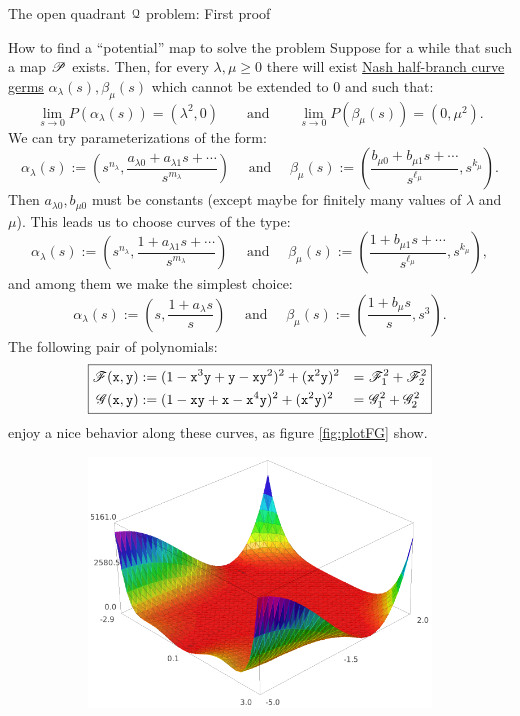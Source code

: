 \documentclass[11pt, a4paper, english, twoside, notitlepage, openright]{report}
\begin{document}
\begin{chapter}{The open quadrant $\Qu$ problem: First proof}
\begin{section}{How to find a ``potential'' map to solve the problem}
Suppose for a while that such a map $\P$ exists. Then, for every $\lambda,\mu\ge 0$ there will exist \hyperref[curveGerms]{Nash half-branch curve germs} $\alpha_{\lambda}(s),\beta_{\mu}(s)$ which cannot be extended to $0$ and such that:
$$
\lim_{s\rightarrow 0} P(\alpha_{\lambda}(s))=(\lambda^2,0)\qquad \text{and} \qquad \lim_{s\rightarrow 0} P(\beta_{\mu}(s))=(0,\mu^2).
$$
We can try parameterizations of the form:
$$
\alpha_{\lambda}(s):=\left(s^{n_{\lambda}},\frac{a_{\lambda 0}+a_{\lambda 1}s+\cdots}{s^{m_{\lambda}}}\right)
\quad \text{ and } \quad
\beta_{\mu}(s):=\left(\frac{b_{\mu 0}+b_{\mu 1}s+\cdots}{s^{\ell_{\mu}}},s^{k_{\mu}}\right).
$$
Then $a_{\lambda 0},b_{\mu 0}$ must be constants (except maybe for finitely many values of $\lambda$ and $\mu$). This leads us to choose curves of the type:
$$
\alpha_{\lambda}(s):=\left(s^{n_{\lambda}},\frac{1+a_{\lambda 1}s+\cdots}{s^{m_{\lambda}}}\right)
\quad \text{ and } \quad
\beta_{\mu}(s):=\left(\frac{1+b_{\mu 1}s+\cdots}{s^{\ell_{\mu}}},s^{k_{\mu}}\right),
$$
and among them we make the simplest choice: 
$$
\alpha_{\lambda}(s):=\left(s,\frac{1+a_{\lambda }s}{s}\right)
\quad \text{ and } \quad
\beta_{\mu}(s):=\left(\frac{1+b_{\mu }s}{s},s^{3}\right).
$$
The following pair of polynomials:
\begin{equation*}
\boxed{
\begin{aligned}
\F({\tt x},{\tt y})&:=(1-{\tt x}^3{\tt y}+{\tt y}-{\tt x}{\tt y}^2)^2+({\tt x}^2{\tt y})^2&=&\ \F_1^2+\F_2^2 \\
\G({\tt x},{\tt y})&:=(1-{\tt x}{\tt y}+{\tt x}-{\tt x}^4{\tt y})^2+({\tt x}^2{\tt y})^2&=&\ \G_1^2+\G_2^2\\
\end{aligned}
}
\end{equation*}
enjoy a nice behavior along these curves, as figure \ref{fig:plotFG} show.
\begin{figure}[h]\hspace{-0.15cm}
\begin{subfigure}{.49\linewidth}\centering
\includegraphics[width=1\textwidth]{plots/ch1_04_F.png}

\end{subfigure}
\end{figure}
\end{section}
\end{chapter}
\end{document}
